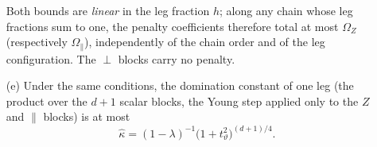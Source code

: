 \begin{lemma}
\begin{enumerate}
Both bounds are \emph{linear} in the leg fraction \(h\); along any chain
whose leg fractions sum to one, the penalty coefficients therefore total at
most \(\Omega_Z\) (respectively \(\Omega_\parallel\)), independently of the
chain order and of the leg configuration.  The \(\perp\) blocks carry no
penalty.
\item[(e)] Under the same conditions, the domination constant of one leg
(the product over the \(d+1\) scalar blocks, the Young step applied only to
the \(Z\) and \(\parallel\) blocks) is at most
\begin{equation}
 \hat\kappa
 =(1-\lambda)^{-1}\bigl(1+t_\vartheta^2\bigr)^{(d+1)/4}.
 \label{eq:exactmfull-b0-kappahat}
\end{equation}
\end{enumerate}
\end{lemma}

